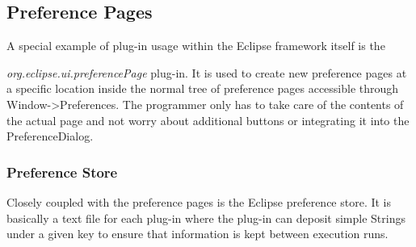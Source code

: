 \subsection{Preference Pages}
\label{section:TechPreferencePage}
A special example of plug-in usage within the Eclipse framework itself is the 

\textit{org.eclipse.ui.preferencePage} plug-in. 
It is used to create new preference pages at a specific location inside the
normal tree of preference pages accessible through Window->Preferences.
The programmer only has to take care of the contents of the actual page and not worry
about additional buttons or integrating it into the PreferenceDialog.

\subsubsection{Preference Store}
\label{section:TechPreferenceStore}
Closely coupled with the preference pages is the Eclipse preference store. It is
basically a text file for each plug-in where the plug-in can deposit simple Strings
under a given key to ensure that information is kept between execution runs.